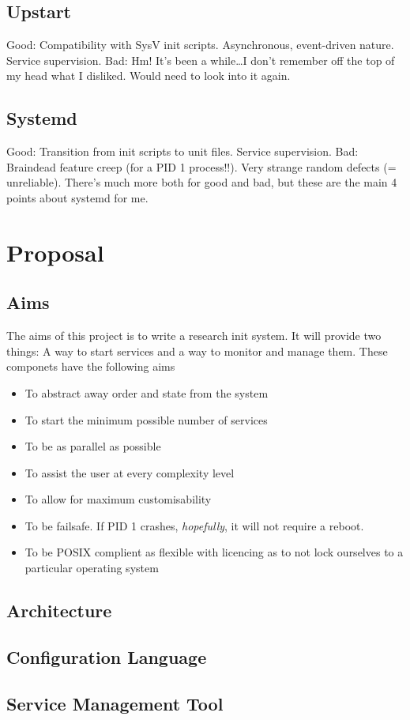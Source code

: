 \documentclass{article}
\newcommand*{\bibtitle}{Bibliography}
\begin{document}
\subsection{Upstart}
Good: Compatibility with SysV init scripts. Asynchronous, event-driven nature. Service
supervision. Bad: Hm! It's been a while\dots I don't remember off the top of my head what I
disliked. Would need to look into it again.

\subsection{Systemd}
Good: Transition from init scripts to unit files. Service supervision. Bad: Braindead
feature creep (for a PID 1 process!!). Very strange random defects (= unreliable). There's
much more both for good and bad, but these are the main 4 points about systemd for me.

\section{Proposal}
\subsection{Aims}
The aims of this project is to write a research init system. It will provide
two things: A way to start services and a way to monitor and manage them.
These componets have the following aims
\begin{itemize}
    \item To abstract away order and state from the system
    \item To start the minimum possible number of services
    \item To be as parallel as possible
    \item To assist the user at every complexity level
    \item To allow for maximum customisability
    \item To be failsafe. If PID 1 crashes, \textit{hopefully}, it will not require a reboot.
    \item To be POSIX complient as flexible with licencing as to not lock ourselves to a particular operating system
\end{itemize}

\subsection{Architecture}
\subsection{Configuration Language}
\subsection{Service Management Tool}

\setlength{\baselineskip}{0pt} %

{\renewcommand*\MakeUppercase[1]{#1}%
\printbibliography[heading=bibintoc,title={\bibtitle}]}
\end{document}
